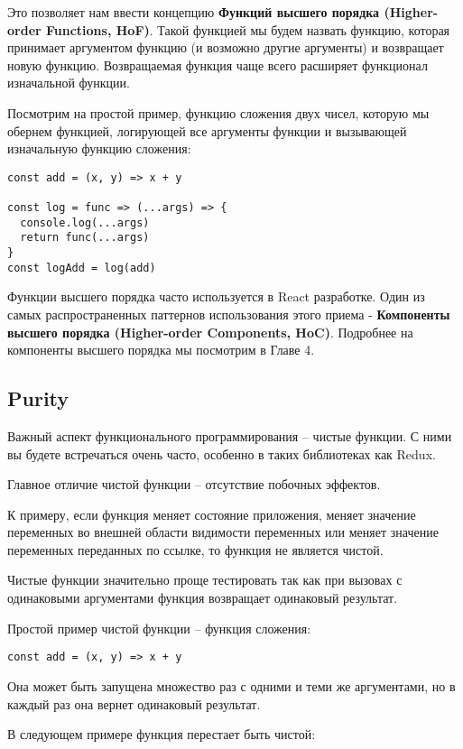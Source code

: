 Это позволяет нам ввести концепцию \textbf{Функций высшего порядка (Higher-order Functions, HoF)}. Такой функцией мы будем назвать функцию, которая принимает аргументом функцию (и возможно другие аргументы) и возвращает новую функцию. Возвращаемая функция чаще всего расширяет функционал изначальной функции.

Посмотрим на простой пример, функцию сложения двух чисел, которую мы обернем функцией, логирующей все аргументы функции и вызывающей изначальную функцию сложения:

\begin{lstlisting}
const add = (x, y) => x + y

const log = func => (...args) => {
  console.log(...args)
  return func(...args)
}
const logAdd = log(add)
\end{lstlisting}

Функции высшего порядка часто используется в React разработке. Один из самых распространенных паттернов использования этого приема - \textbf{Компоненты высшего порядка (Higher-order Components, HoC)}. Подробнее на компоненты высшего порядка мы посмотрим в Главе 4.

\subsection{Purity}

Важный аспект функционального программирования -- чистые функции. С ними вы будете встречаться очень часто, особенно в таких библиотеках как Redux.

Главное отличие чистой функции -- отсутствие побочных эффектов.

К примеру, если функция меняет состояние приложения, меняет значение переменных во внешней области видимости переменных или меняет значение переменных переданных по ссылке, то функция не является чистой.

Чистые функции значительно проще тестировать так как при вызовах с одинаковыми аргументами функция возвращает одинаковый результат.

Простой пример чистой функции -- функция сложения:

\begin{lstlisting}
const add = (x, y) => x + y 
\end{lstlisting}

Она может быть запущена множество раз с одними и теми же аргументами, но в каждый раз она вернет одинаковый результат. 

В следующем примере функция перестает быть чистой:

